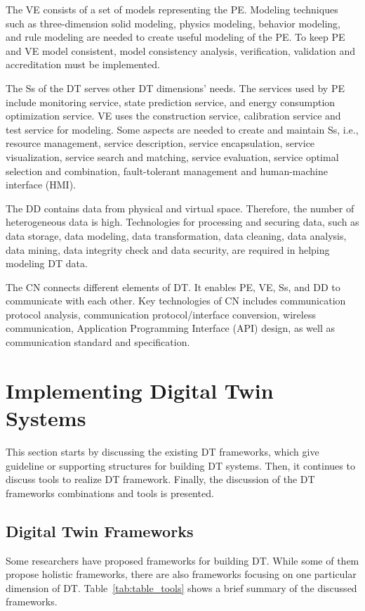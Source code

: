 \documentclass[article,table]{aaltoseries}
\begin{document}
The VE consists of a set of models representing the PE. Modeling techniques such as three-dimension solid modeling, physics modeling, behavior modeling, and rule modeling are needed to create useful modeling of the PE. To keep PE and VE model consistent, model consistency analysis, verification, validation and accreditation must be implemented.

The Ss of the DT serves other DT dimensions' needs. The services used by PE include monitoring service, state prediction service, and energy consumption optimization service. VE uses the construction service, calibration service and test service for modeling. Some aspects are needed to create and maintain Ss, i.e., resource management, service description, service encapsulation, service visualization, service search and matching, service evaluation, service optimal selection and combination, fault-tolerant management and human-machine interface (HMI).

The DD contains data from physical and virtual space. Therefore, the number of heterogeneous data is high. Technologies for processing and securing data, such as data storage, data modeling, data transformation, data cleaning, data analysis, data mining, data integrity check and data security, are required in helping modeling DT data.

The CN connects different elements of DT. It enables PE, VE, Ss, and DD to communicate with each other. Key technologies of CN includes communication protocol analysis, communication protocol/interface conversion, wireless communication, Application Programming Interface (API) design, as well as communication standard and specification.

\section{Implementing Digital Twin Systems}
This section starts by discussing the existing DT frameworks, which give guideline or supporting structures for building DT systems. Then, it continues to discuss tools to realize DT framework. Finally, the discussion of the DT frameworks combinations and tools is presented.

\subsection{Digital Twin Frameworks}
Some researchers have proposed frameworks for building DT. While some of them propose holistic frameworks, there are also frameworks focusing on one particular dimension of DT. Table~\ref{tab:table_tools} shows a brief summary of the discussed frameworks.
\end{document}
